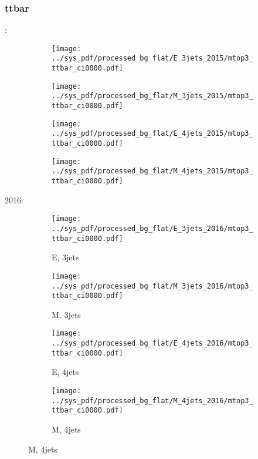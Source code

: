 \documentclass{beamer}
\begin{document}
\begin{frame}
\frametitle{ttbar}
\fontsize{5}{1}:
\begin{figure}
\centering
\begin{subfigure}[b]{0.24\textwidth}
\texttt{[image: ../sys\_pdf/processed\_bg\_flat/E\_3jets\_2015/mtop3\_ttbar\_ci0000.pdf]}
\end{subfigure}
\begin{subfigure}[b]{0.24\textwidth}
\texttt{[image: ../sys\_pdf/processed\_bg\_flat/M\_3jets\_2015/mtop3\_ttbar\_ci0000.pdf]}
\end{subfigure}
\begin{subfigure}[b]{0.24\textwidth}
\texttt{[image: ../sys\_pdf/processed\_bg\_flat/E\_4jets\_2015/mtop3\_ttbar\_ci0000.pdf]}
\end{subfigure}
\begin{subfigure}[b]{0.24\textwidth}
\texttt{[image: ../sys\_pdf/processed\_bg\_flat/M\_4jets\_2015/mtop3\_ttbar\_ci0000.pdf]}
\end{subfigure}
\end{figure}
2016:
\begin{figure}
\centering
\begin{subfigure}[b]{0.24\textwidth}
\texttt{[image: ../sys\_pdf/processed\_bg\_flat/E\_3jets\_2016/mtop3\_ttbar\_ci0000.pdf]}
\captionsetup{font=tiny}
\caption{E, 3jets}
\end{subfigure}
\begin{subfigure}[b]{0.24\textwidth}
\texttt{[image: ../sys\_pdf/processed\_bg\_flat/M\_3jets\_2016/mtop3\_ttbar\_ci0000.pdf]}
\captionsetup{font=tiny}
\caption{M, 3jets}
\end{subfigure}
\begin{subfigure}[b]{0.24\textwidth}
\texttt{[image: ../sys\_pdf/processed\_bg\_flat/E\_4jets\_2016/mtop3\_ttbar\_ci0000.pdf]}
\captionsetup{font=tiny}
\caption{E, 4jets}
\end{subfigure}
\begin{subfigure}[b]{0.24\textwidth}
\texttt{[image: ../sys\_pdf/processed\_bg\_flat/M\_4jets\_2016/mtop3\_ttbar\_ci0000.pdf]}
\captionsetup{font=tiny}
\caption{M, 4jets}
\end{subfigure}
\end{figure}
\end{frame}
\end{document}
